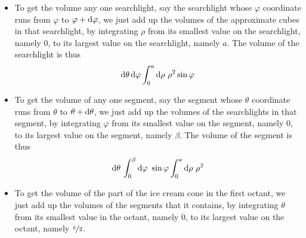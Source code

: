 \begin{eg}
\begin{itemize}
\item
To get the volume any one searchlight, say the searchlight whose 
$\varphi$ coordinate runs from $\varphi$ to $\varphi+\mathrm{d}\varphi$, 
we just add up the volumes of the approximate cubes in that searchlight, 
by integrating $\rho$ from its smallest value on the searchlight, namely $0$, 
to its largest value on the searchlight, namely $a$. The volume of the 
searchlight is thus
\begin{align*}
\mathrm{d}\theta\,\mathrm{d}\varphi\int_0^a\mathrm{d}\rho\  \rho^2\sin\varphi
\end{align*}

\item
To get the volume of any one segment, say the segment whose $\theta$ 
coordinate runs from $\theta$ to $\theta+\mathrm{d}\theta$, we just 
add up the volumes of the searchlights in that segment, by integrating 
$\varphi$ from its smallest value on the segment, namely $0$, to its 
largest value on the segment, namely $\beta$. The volume of the segment 
is thus
\begin{align*}
\mathrm{d}\theta\,\int_0^\beta \mathrm{d}\varphi\ \sin\varphi
               \int_0^a\mathrm{d}\rho\  \rho^2
\end{align*}

\item
To get the volume of the part of the ice cream cone in the first octant, 
we just add up the volumes of the segments that it contains, by integrating 
$\theta$ from its smallest value in the octant, namely $0$, to its largest value on the octant, namely  $\nicefrac{\pi}{2}$. 


\end{itemize}
\end{eg}
